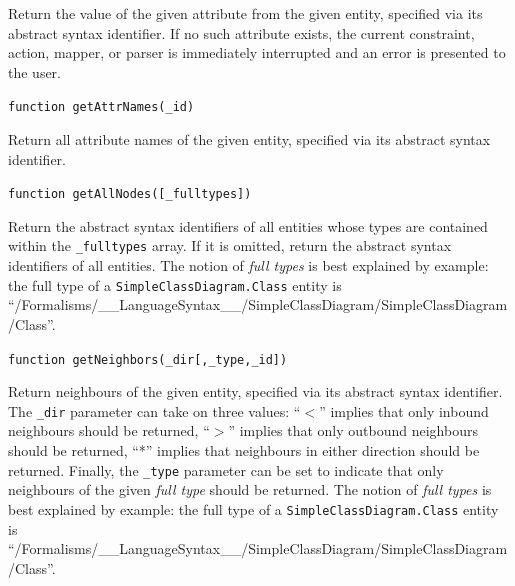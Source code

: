 \documentclass{article}
\numberwithin{equation}{section}
\numberwithin{figure}{section}
\begin{document}
Return the value of the given attribute from the given entity, specified via its abstract syntax identifier. If no such attribute exists, the current constraint, action, mapper, or parser is immediately interrupted and an error is presented to the user.\\
\vspace*{1em}


\begin{center}	{\large \texttt{function getAttrNames(\_id)}} \end{center}

Return all attribute names of the given entity, specified via its abstract syntax identifier.\\
\vspace*{1em}


\begin{center}	{\large \texttt{function getAllNodes([\_fulltypes])}} \end{center}

Return the abstract syntax identifiers of all entities whose types are contained within the \texttt{\_fulltypes} array. If it is omitted, return the abstract syntax identifiers of all entities. The notion of \textit{full types} is best explained by example: the full type of a \texttt{SimpleClassDiagram.Class} entity is ``/Formalisms/\_\_LanguageSyn\-tax\_\_/SimpleClassDiagram/SimpleClassDiagram/Class''.\\
\vspace*{1em}


\begin{center}	{\large \texttt{function getNeighbors(\_dir[,\_type,\_id])}} \end{center}

Return neighbours of the given entity, specified via its abstract syntax identifier. The \texttt{\_dir} parameter can take on three values: ``$<$'' implies that only inbound neighbours should be returned, ``$>$'' implies that only outbound neighbours should be returned, ``*'' implies that neighbours in either direction should be returned. Finally, the \texttt{\_type} parameter can be set to indicate that only neighbours of the given \textit{full type} should be returned. The notion of \textit{full types} is best explained by example: the full type of a \texttt{SimpleClassDiagram.Class} entity is ``/Formalisms/\_\_LanguageSyntax\_\_/SimpleClassDiagram/SimpleClassDiagram/Class''.\\
\vspace*{1em}
\end{document}
